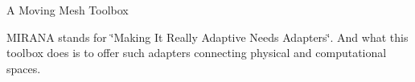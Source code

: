 A Moving Mesh Toolbox



M\-I\-R\-A\-N\-A stands for \char`\"{}\-Making It Really Adaptive Needs Adapters\char`\"{}. And what this toolbox does is to offer such adapters connecting physical and computational spaces. 